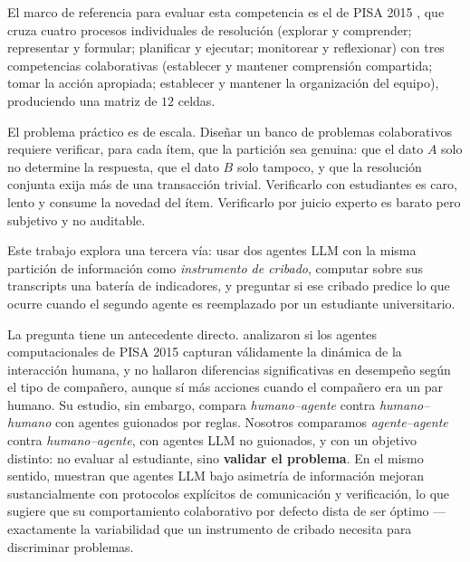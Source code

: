 \documentclass[11pt,a4paper]{article}
\theoremstyle{definition}
\theoremstyle{plain}
\theoremstyle{remark}
\begin{document}
El marco de referencia para evaluar esta competencia es el de PISA 2015
\citep{oecd2017cps}, que cruza cuatro procesos individuales de resolución
(explorar y comprender; representar y formular; planificar y ejecutar; monitorear
y reflexionar) con tres competencias colaborativas (establecer y mantener
comprensión compartida; tomar la acción apropiada; establecer y mantener la
organización del equipo), produciendo una matriz de $12$ celdas.

El problema práctico es de escala. Diseñar un banco de problemas colaborativos
requiere verificar, para cada ítem, que la partición sea genuina: que el dato $A$
solo no determine la respuesta, que el dato $B$ solo tampoco, y que la resolución
conjunta exija más de una transacción trivial. Verificarlo con estudiantes es
caro, lento y consume la novedad del ítem. Verificarlo por juicio experto es
barato pero subjetivo y no auditable.

Este trabajo explora una tercera vía: usar dos agentes LLM con la misma partición
de información como \emph{instrumento de cribado}, computar sobre sus transcripts
una batería de indicadores, y preguntar si ese cribado predice lo que ocurre
cuando el segundo agente es reemplazado por un estudiante universitario.

La pregunta tiene un antecedente directo. \citet{herborn2020agents} analizaron si
los agentes computacionales de PISA 2015 capturan válidamente la dinámica de la
interacción humana, y no hallaron diferencias significativas en desempeño según el
tipo de compañero, aunque sí más acciones cuando el compañero era un par humano.
Su estudio, sin embargo, compara \emph{humano--agente} contra
\emph{humano--humano} con agentes guionados por reglas. Nosotros comparamos
\emph{agente--agente} contra \emph{humano--agente}, con agentes LLM
no guionados, y con un objetivo distinto: no evaluar al estudiante, sino
\textbf{validar el problema}. En el mismo sentido, \citet{peng2025asymmetry}
muestran que agentes LLM bajo asimetría de información mejoran sustancialmente con
protocolos explícitos de comunicación y verificación, lo que sugiere que su
comportamiento colaborativo por defecto dista de ser óptimo --- exactamente la
variabilidad que un instrumento de cribado necesita para discriminar problemas.
\end{document}
